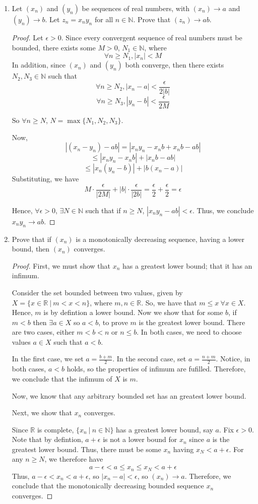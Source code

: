 \documentclass[12pt]{article}
\newcommand{\R}{\mathbb{R}}
\newcommand{\N}{\mathbb{N}}
\begin{document}
\begin{enumerate}
\item Let $(x_n)$ and $(y_n)$ be sequences of real numbers, with $(x_n)\to a$ and $(y_n)\to b$. Let $z_n=x_ny_n$ for all $n\in \N$. Prove that $(z_n)\to ab$.

\begin{proof}
Let $\epsilon > 0$. Since every convergent sequence of real numbers must be bounded, there exists some $M > 0$, $N_1 \in \N$, where 
$$\forall n \geq N_1, |x_n| < M$$
In addition, since $(x_n)$ and $(y_n)$ both converge, then there exists $N_2, N_3 \in \N$ such that 
$$\forall n \geq N_2, |x_n - a| < \frac{\epsilon}{2|b|}$$
$$\forall n \geq N_3, |y_n - b| < \frac{\epsilon}{2M}$$

So $\forall n \geq N$, $N = \max\{N_1, N_2, N_3\}$.

Now, $$|(x_n - y_n) - ab| = |x_ny_n - x_nb + x_nb - ab|$$
$$\leq |x_ny_n -x_nb| + |x_nb-ab|$$
$$\leq |x_n(y_n-b)| + |b(x_n-a)|$$
Substituting, we have
$$M \cdot \frac{\epsilon}{|2M|} + |b| \cdot \frac{\epsilon}{|2b|} = \frac{\epsilon}{2} +\frac{\epsilon}{2} = \epsilon$$

Hence, $\forall \epsilon > 0$, $\exists N \in \N$ such that if $n \geq N$, $|x_ny_n - ab| < \epsilon$.
Thus, we conclude $x_ny_n\to ab$.
\end{proof}

\item Prove that if $(x_n)$ is a monotonically decreasing sequence, having a lower bound, then $(x_n)$ converges.

\begin{proof}
First, we must show that $x_n$ has a greatest lower bound; that it has an infimum. 

Consider the set bounded between two values, given by $X = \{x\in \R\ |\ m < x < n\}$, where $m, n \in \R$. So, we have that $m \leq x\ \forall x \in X$. Hence, $m$ is by defintion a lower bound. Now we show that for some $b$, if $m < b$ then $\exists a \in X$ so $a < b$, to prove $m$ is the greatest lower bound. There are two cases, either $m < b < n$ or $n \leq b$. In both cases, we need to choose values $a \in X$ such that $a <b$. 

In the first case, we set $a = \frac{b+m}{2}$. In the second case, set $a = \frac{n+m}{2}$. 
Notice, in both cases, $a <b$ holds, so the properties of infimum are fufilled. Therefore, we conclude that the infimum of $X$ is $m$. 

Now, we know that any arbitrary bounded set has an greatest lower bound. 

Next, we show that $x_n$ converges.

Since $\R$ is complete, $\{x_n\ |\ n \in \N\}$ has a greatest lower bound, say $a$. Fix $\epsilon > 0$. Note that by defintion, $a + \epsilon$ is not a lower bound for $x_n$ since $a$ is the greatest lower bound. Thus, there must be some $x_n$ having $x_N < a + \epsilon$. For any $n \geq N$, we therefore have
$$a - \epsilon < a \leq x_n \leq x_N < a + \epsilon$$
Thus, $a-\epsilon < x_n < a + \epsilon$, so $|x_n - a| < \epsilon$, so $(x_n) \to a$. Therefore, we conclude that the monotonically decreasing bounded sequence $x_n$ converges. 
\end{proof}

\end{enumerate}
\end{document}
